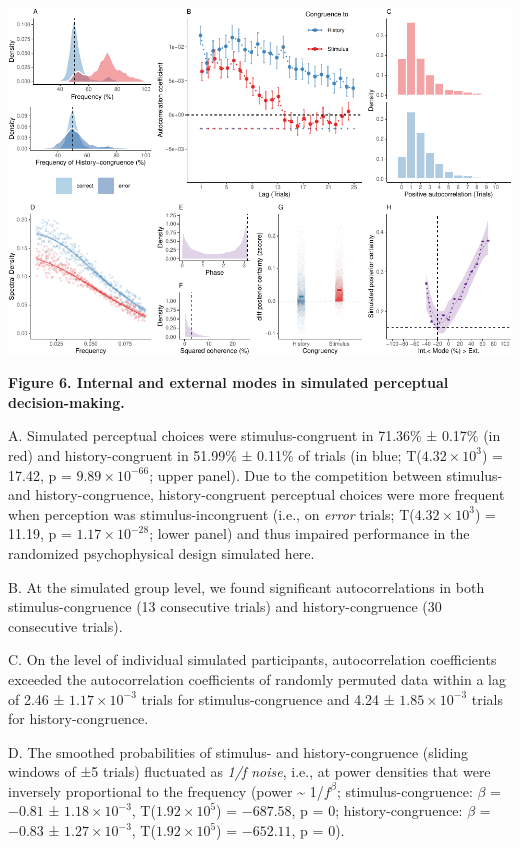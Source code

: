 \documentclass[
]{article}
\begin{document}
\includegraphics{modes_mouse_files/figure-latex/Figure_6-1.pdf}

\textbf{Figure 6. Internal and external modes in simulated perceptual
decision-making.}

A. Simulated perceptual choices were stimulus-congruent in 71.36\% ±
0.17\% (in red) and history-congruent in 51.99\% ± 0.11\% of trials (in
blue; T(\ensuremath{4.32\times 10^{3}}) = 17.42, p =
\(\ensuremath{9.89\times 10^{-66}}\); upper panel). Due to the
competition between stimulus- and history-congruence, history-congruent
perceptual choices were more frequent when perception was
stimulus-incongruent (i.e., on \emph{error} trials;
T(\ensuremath{4.32\times 10^{3}}) = 11.19, p =
\(\ensuremath{1.17\times 10^{-28}}\); lower panel) and thus impaired
performance in the randomized psychophysical design simulated here.

B. At the simulated group level, we found significant autocorrelations
in both stimulus-congruence (13 consecutive trials) and
history-congruence (30 consecutive trials).

C. On the level of individual simulated participants, autocorrelation
coefficients exceeded the autocorrelation coefficients of randomly
permuted data within a lag of 2.46 ± \ensuremath{1.17\times 10^{-3}}
trials for stimulus-congruence and 4.24 ±
\ensuremath{1.85\times 10^{-3}} trials for history-congruence.

D. The smoothed probabilities of stimulus- and history-congruence
(sliding windows of ±5 trials) fluctuated as \emph{1/f noise}, i.e., at
power densities that were inversely proportional to the frequency (power
\textasciitilde{} 1/\(f^\beta\); stimulus-congruence: \(\beta\) =
\(-0.81\) ± \(\ensuremath{1.18\times 10^{-3}}\),
T(\(\ensuremath{1.92\times 10^{5}}\)) = \(-687.58\), p = \(0\);
history-congruence: \(\beta\) = \(-0.83\) ±
\(\ensuremath{1.27\times 10^{-3}}\),
T(\(\ensuremath{1.92\times 10^{5}}\)) = \(-652.11\), p = \(0\)).
\end{document}
